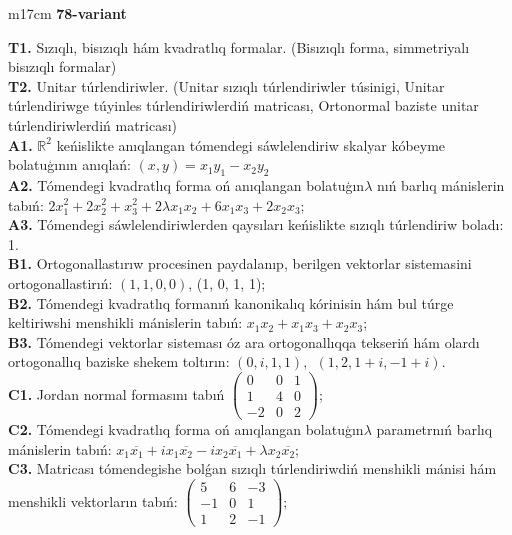 \documentclass{article}
\begin{document}
\begin{tabular}{m{17cm}}
\textbf{78-variant}
\newline

\textbf{T1.} Sızıqlı, bisızıqlı hám kvadratlıq formalar. (Bisızıqlı forma,  simmetriyalı bisızıqlı formalar)  \\
\textbf{T2.} Unitar túrlendiriwler. (Unitar sızıqlı túrlendiriwler túsinigi,  Unitar túrlendiriwge túyinles túrlendiriwlerdiń matricası,   Ortonormal baziste unitar túrlendiriwlerdiń matricası) \\
\textbf{A1.} \(\mathbb{R}^{2}\) keńislikte anıqlangan tómendegi sáwlelendiriw skalyar kóbeyme bolatuģının anıqlań: \((x,y) = x_{1}y_{1} - x_{2}y_{2}\) \\
\textbf{A2.} Tómendegi kvadratlıq forma oń anıqlangan bolatuģın\(\lambda\) nıń barlıq mánislerin tabıń: \(2x_{1}^{2} + 2x_{2}^{2} + x_{3}^{2} + 2\lambda x_{1}x_{2} + 6x_{1}x_{3} + 2x_{2}x_{3}\); \\
\textbf{A3.} Tómendegi sáwlelendiriwlerden qaysıları keńislikte sızıqlı túrlendiriw boladı: 1. \\
\textbf{B1.} Ortogonallastırıw procesinen paydalanıp, berilgen vektorlar sistemasini ortogonallastirıń: \((1,1,0,0)\), (1, 0, 1, 1); \\
\textbf{B2.} Tómendegi kvadratlıq formanıń kanonikalıq kórinisin hám bul túrge keltiriwshi menshikli mánislerin tabıń: \(x_{1}x_{2} + x_{1}x_{3} + x_{2}x_{3}\); \\
\textbf{B3.} Tómendegi vektorlar sisteması óz ara ortogonallıqqa tekseriń hám olardı ortogonallıq baziske shekem toltırın: \((0,i,1,1),\ \ (1,2,1 + i, - 1 + i)\). \\
\textbf{C1.} Jordan normal formasını tabıń \(\begin{pmatrix} 0 & 0 & 1 \\ 1 & 4 & 0 \\  - 2 & 0 & 2 \end{pmatrix}\); \\
\textbf{C2.} Tómendegi kvadratlıq forma oń anıqlangan bolatuģın\(\lambda\) parametrnıń barlıq mánislerin tabıń: \(x_{1}\overline{x_{1}} + ix_{1}\overline{x_{2}} - ix_{2}\overline{x_{1}} + \lambda x_{2}\overline{x_{2}}\); \\
\textbf{C3.} Matricası tómendegishe bolǵan sızıqlı túrlendiriwdiń menshikli mánisi hám menshikli vektorların tabıń: \(\begin{pmatrix} 5 & 6 & - 3 \\  - 1 & 0 & 1 \\ 1 & 2 & - 1 \end{pmatrix}\); \\

\end{tabular}
\vspace{1cm}
\end{document}
